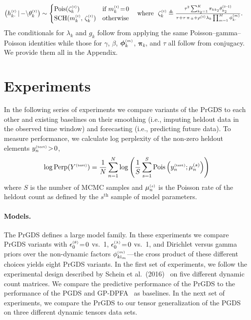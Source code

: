 \documentclass{article}
\begin{document}
% 
\begin{align}
\left(\hkdt \given {-\backslash} \thetakt\right) &\sim 
\begin{cases}
\textrm{Pois}(\zeta_{k}^{\mathsmaller{(t)}}) &\textrm{if } \mkt \teq 0 \\ 
% 
\textrm{SCH}(\mkt,\, \zeta_{k}^{\mathsmaller{(t)}}) &\textrm{otherwise}
\end{cases} 
\hspace{1em}\textrm{where }\,\,
\zeta_{k}^{\mathsmaller{(t)}} \triangleq \mathsmaller{\frac{\tau^2 \sum_{k_2=1}^K \pi_{kk_2} \thetakttm}{\tau + \tau\,\pi_{\cdot k} + \rhot \lambda_k \prod_{m=1}^M\phi^{\mathsmaller{(m)}}_{k\cdot }}}.
\end{align}
The conditionals for $\lambda_k$ and $g_k$ follow from applying the same Poisson--gamma--Poisson identities while those for $\gamma$, $\beta$, $\boldsymbol{\phi}^{\mathsmaller{(m)}}_k$, $\boldsymbol{\pi}_{k}$, and $\tau$ all follow from conjugacy. We provide them all in the Appendix.~

\section{Experiments}
\label{sec:experiments}
In the following series of experiments we compare variants of the PrGDS to each other and existing baselines on their smoothing (i.e., imputing heldout data in the observed time window) and forecasting (i.e., predicting future data). To measure performance, we calculate log perplexity of the non-zero heldout elements $y^{\mathsmaller{(\textrm{test})}}_n \!>\! 0$,~
\begin{equation}
\label{eq:perplexity}
\log \textrm{Perp}(Y^{\mathsmaller{(\textrm{test})}}) = \frac{1}{N}\sum_{n=1}^N \log \left(\frac{1}{S}\sum_{s=1}^S \textrm{Pois}\left(y^{\mathsmaller{(\textrm{test})}}_n; \mu_n^{(s)}\right) \right)
\end{equation}
where $S$ is the number of MCMC samples and $\mu_n^{\mathsmaller{(s)}}$ is the Poisson rate of the heldout count as defined by the $s^{\textrm{th}}$ sample of model parameters.

\paragraph{Models.} The PrGDS defines a large model family. In these experiments we compare PrGDS variants with $\epstheta \teq 0$ vs.\ 1,  $\epslambda  \teq 0$ vs.\ 1, and Dirichlet versus gamma priors over the non-dynamic factors $\phi^{\mathsmaller{(m)}}_{k \osub_m}$---the cross product of these different choices yields eight PrGDS variants. In the first set of experiments, we follow the experimental design described by Schein et al.~(2016)~\cite{schein2016poisson} on five different dynamic count matrices. We compare the predictive performance of the PrGDS to the performance of the PGDS and GP-DPFA~\cite{acharya2015nonparametric} as baselines. In the next set of experiments, we compare the PrGDS to our tensor generalization of the PGDS on three different dynamic tensors data sets.~
\end{document}
